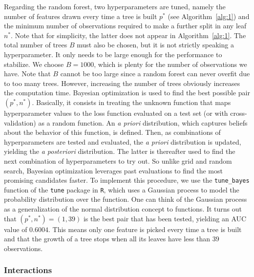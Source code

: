 \documentclass{article}
\begin{document}
Regarding the random forest, two hyperparameters are tuned, namely the number of features drawn every time a tree is built $p^*$ (see Algorithm~\ref{alg:1}) and the minimum number of observations required to make a further split in any leaf $n^*$. Note that for simplicity, the latter does not appear in Algorithm~\ref{alg:1}. The total number of trees $B$ must also be chosen, but it is not strictly speaking a hyperparameter. It only needs to be large enough for the performance to stabilize. We choose $B = 1000$, which is plenty for the number of observations we have. Note that $B$ cannot be too large since a random forest can never overfit due to too many trees. However, increasing the number of trees obviously increases the computation time. Bayesian optimization is used to find the best possible pair $(p^*, n^*)$. Basically, it consists in treating the unknown function that maps hyperparameter values to the loss function evaluated on a test set (or with cross-validation) as a random function. An \textit{a priori} distribution, which captures beliefs about the behavior of this function, is defined. Then, as combinations of hyperparameters are tested and evaluated, the \textit{a priori} distribution is updated, yielding the \textit{a posteriori} distribution. The latter is thereafter used to find the next combination of hyperparameters to try out. So unlike grid and random search, Bayesian optimization leverages past evaluations to find the most promising candidates faster. To implement this procedure, we use the \texttt{tune\_bayes} function of the \texttt{tune} package in \texttt{R}, which uses a Gaussian process to model the probability distribution over the function. One can think of the Gaussian process as a generalization of the normal distribution concept to functions. It turns out that $(p^*, n^*) = (1, 39)$ is the best pair that has been tested, yielding an AUC value of $0.6004$. This means only one feature is picked every time a tree is built and that the growth of a tree stops when all its leaves have less than $39$ observations. 

\subsubsection{Interactions}
\end{document}
